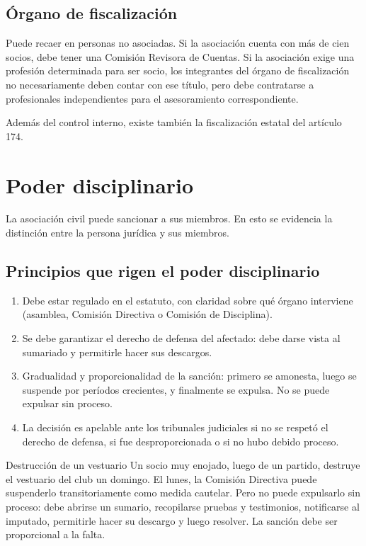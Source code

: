 \documentclass[12pt,oneside]{book}
\begin{document}
\subsection{Órgano de fiscalización}

Puede recaer en personas no asociadas. Si la asociación cuenta con más de cien socios, debe tener una Comisión Revisora de Cuentas. Si la asociación exige una profesión determinada para ser socio, los integrantes del órgano de fiscalización no necesariamente deben contar con ese título, pero debe contratarse a profesionales independientes para el asesoramiento correspondiente.

Además del control interno, existe también la fiscalización estatal del artículo 174.

\section{Poder disciplinario}

La asociación civil puede sancionar a sus miembros. En esto se evidencia la distinción entre la persona jurídica y sus miembros.

\subsection{Principios que rigen el poder disciplinario}

\begin{enumerate}
    \item Debe estar regulado en el estatuto, con claridad sobre qué órgano interviene (asamblea, Comisión Directiva o Comisión de Disciplina).
    \item Se debe garantizar el derecho de defensa del afectado: debe darse vista al sumariado y permitirle hacer sus descargos.
    \item Gradualidad y proporcionalidad de la sanción: primero se amonesta, luego se suspende por períodos crecientes, y finalmente se expulsa. No se puede expulsar sin proceso.
    \item La decisión es apelable ante los tribunales judiciales si no se respetó el derecho de defensa, si fue desproporcionada o si no hubo debido proceso.
\end{enumerate}

\begin{example}{Destrucción de un vestuario}
Un socio muy enojado, luego de un partido, destruye el vestuario del club un domingo. El lunes, la Comisión Directiva puede suspenderlo transitoriamente como medida cautelar. Pero no puede expulsarlo sin proceso: debe abrirse un sumario, recopilarse pruebas y testimonios, notificarse al imputado, permitirle hacer su descargo y luego resolver. La sanción debe ser proporcional a la falta.
\end{example}
\end{document}
